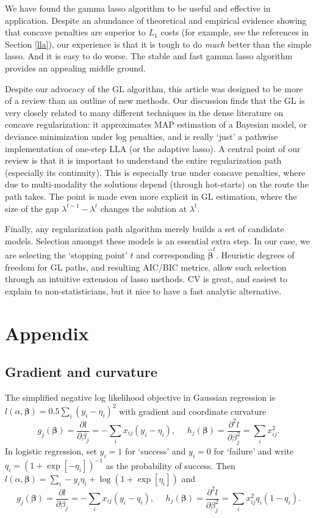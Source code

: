 \documentclass[12pt]{article}
\newcommand{\bs}[1]{\boldsymbol{#1}}
\begin{document}
 We have found the gamma lasso
algorithm to be  useful and effective in application.  
Despite an abundance of theoretical and  empirical evidence showing that
concave penalties are superior to $L_1$ costs (for example,
see the references in Section \ref{lla}), our experience is that it is tough to do
{\it much} better than the simple lasso.  And it is easy to do worse.  The stable and fast gamma lasso algorithm provides an appealing middle
ground.

Despite our advocacy of the GL algorithm, this article was designed to be more of a review than an outline of new methods.  Our discussion finds that
the GL is very closely related to many different techniques in the dense
literature on concave regularization: it approximates MAP estimation of a
Bayesian model, or deviance minimization under log penalties, and is really
`just' a pathwise implementation of one-step LLA (or the adaptive lasso). A
central point of our review is that it is important to understand 
the entire regularization path (especially its continuity). This is especially
true under concave penalties, where due to multi-modality the solutions depend
(through hot-starts) on the route the path takes.  The point is made even
more explicit in GL estimation, where the size of the gap $\lambda^{t-1} -
\lambda^{t}$ changes the solution at $\lambda^t$.

Finally, any regularization path algorithm merely builds a set of candidate
models. Selection amongst these models is an essential extra step.  In our
case, we are selecting the `stopping point' $t$ and corresponding
$\bs{\hat\beta}^t$. Heuristic degrees of freedom for GL paths, and
resulting AIC/BIC metrics,  allow such selection through an intuitive
extension of lasso methods. CV is great, and easiest to
explain to non-statisticians, but it nice to have a fast analytic alternative.


\appendix

\section{Appendix}

\subsection{Gradient and curvature}
\label{models}

The
simplified negative log likelihood objective in Gaussian regression is $
l(\alpha,\bs{\beta}) = 0.5\sum_i (y_i -\eta_i)^2 $ with gradient
and coordinate curvature
\[
g_j(\bs{\beta}) = \frac{\partial l}{\partial \beta_j} = -\sum_i
x_{ij}(y_i - \eta_i),~~~~~~
h_j(\bs{\beta}) = \frac{\partial^2 l}{\partial \beta_j^2} = \sum_i
x_{ij}^2.
\]
In logistic regression, set $y_i = 1$ for `success' and $y_i = 0$ for
`failure' and write $q_i = (1 + \exp[-\eta_i])^{-1}$ as the
probability of success.  Then
$l(\alpha,\bs{\beta}) = \sum_i -y_i\eta_i + \log(1 +
  \exp[\eta_i])$ and
\[
g_j(\bs{\beta}) = \frac{\partial l}{\partial \beta_j} = -\sum_i
x_{ij}(y_i - q_i),~~~~~~
h_j(\bs{\beta}) = \frac{\partial^2 l}{\partial \beta_j^2} = \sum_i
x_{ij}^2q_i(1-q_i).
\]
\end{document}
